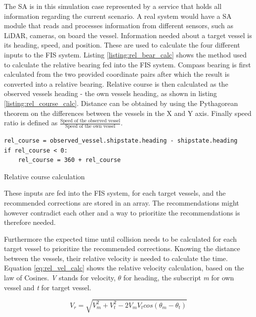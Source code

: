 The SA is in this simulation case represented by a service that holds all information regarding the current scenario. A real system would have a SA module that reads and processes information from different sensors, such as LiDAR, cameras, on board the vessel. Information needed about a target vessel is its heading, speed, and position. These are used to calculate the four different inputs to the FIS system. Listing \ref{listing:rel_bear_calc} shows the method used to calculate the relative bearing fed into the FIS system. Compass bearing is first calculated from the two provided coordinate pairs after which the result is converted into a relative bearing. Relative course is then calculated as the observed vessels heading - the own vessels heading, as shown in listing \ref{listing:rel_course_calc}. Distance can be obtained by using the Pythagorean theorem on the differences between the vessels in the X and Y axis. Finally speed ratio is defined as $\frac{\text{Speed of the observed vessel}}{\text{Speed of the own vessel}}$.
\begin{listing}

    \begin{verbatim}
rel_course = observed_vessel.shipstate.heading - shipstate.heading
if rel_course < 0:
    rel_course = 360 + rel_course
    \end{verbatim}
    \caption{Relative course calculation}
    \label{listing:rel_course_calc}
\end{listing}

These inputs are fed into the FIS system, for each target vessels, and the recommended corrections are stored in an array. The recommendations might however contradict each other and a way to prioritize the recommendations is therefore needed.

Furthermore the expected time until collision needs to be calculated for each target vessel to prioritize the recommended corrections. Knowing the distance between the vessels, their relative velocity is needed to calculate the time. Equation \ref{eq:rel_vel_calc} shows the relative velocity calculation, based on the law of Cosines. \textit{V} stands for velocity, $\theta$ for heading, the subscript \textit{m} for own vessel and \textit{t} for target vessel.

\begin{equation}
    V_r=\sqrt{V_m^2 + V_t^2-2  V_mV_tcos(\theta_m-\theta_t)}
    \label{eq:rel_vel_calc}
\end{equation}


